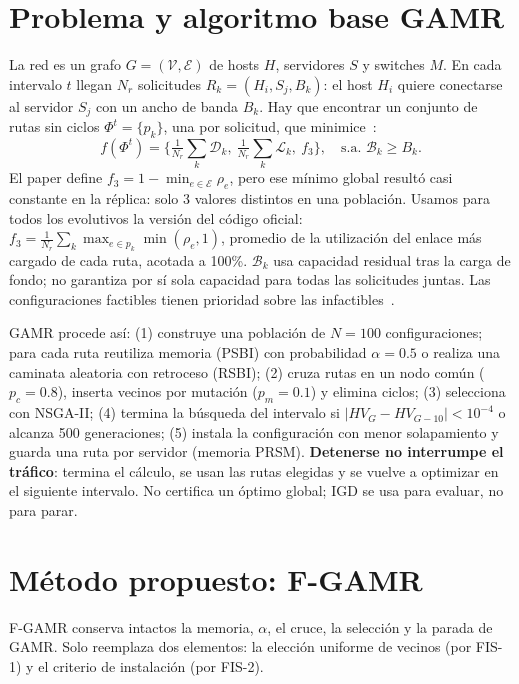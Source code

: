 \documentclass[conference]{IEEEtran}
\newcommand{\Dc}{\mathcal{D}}
\newcommand{\Lc}{\mathcal{L}}
\newcommand{\Bc}{\mathcal{B}}
\begin{document}
\section{Problema y algoritmo base GAMR}
La red es un grafo $G=(\mathcal{V},\mathcal{E})$ de hosts $H$, servidores $S$ y switches $M$. En cada intervalo $t$ llegan $N_r$ solicitudes $R_k=(H_i,S_j,B_k)$: el host $H_i$ quiere conectarse al servidor $S_j$ con un ancho de banda $B_k$. Hay que encontrar un conjunto de rutas sin ciclos $\Phi^t=\{p_k\}$, una por solicitud, que minimice~\cite{tran2025gamr}:
\begin{equation}
f(\Phi^t)=\Big\{\tfrac{1}{N_r}\textstyle\sum_k \Dc_k,\ \tfrac{1}{N_r}\sum_k \Lc_k,\ f_3\Big\},\quad \text{s.a. } \Bc_k\ge B_k .\label{eq:obj}
\end{equation}
El paper define $f_3=1-\min_{e\in\mathcal{E}}\rho_e$, pero ese mínimo global resultó casi constante en la réplica: solo 3 valores distintos en una población. Usamos para todos los evolutivos la versión del código oficial: $f_3=\frac{1}{N_r}\sum_k\max_{e\in p_k}\min(\rho_e,1)$, promedio de la utilización del enlace más cargado de cada ruta, acotada a 100\%. $\Bc_k$ usa capacidad residual tras la carga de fondo; no garantiza por sí sola capacidad para todas las solicitudes juntas. Las configuraciones factibles tienen prioridad sobre las infactibles~\cite{deb2000constraint}.

GAMR procede así: (1) construye una población de $N=100$ configuraciones; para cada ruta reutiliza memoria (PSBI) con probabilidad $\alpha=0.5$ o realiza una caminata aleatoria con retroceso (RSBI); (2) cruza rutas en un nodo común ($p_c=0.8$), inserta vecinos por mutación ($p_m=0.1$) y elimina ciclos; (3) selecciona con NSGA-II; (4) termina la búsqueda del intervalo si $|HV_G-HV_{G-10}|<10^{-4}$ o alcanza 500 generaciones; (5) instala la configuración con menor solapamiento y guarda una ruta por servidor (memoria PRSM). \textbf{Detenerse no interrumpe el tráfico}: termina el cálculo, se usan las rutas elegidas y se vuelve a optimizar en el siguiente intervalo. No certifica un óptimo global; IGD se usa para evaluar, no para parar.

\section{Método propuesto: F-GAMR}
F-GAMR conserva intactos la memoria, $\alpha$, el cruce, la selección y la parada de GAMR. Solo reemplaza dos elementos: la elección uniforme de vecinos (por FIS-1) y el criterio de instalación (por FIS-2).
\end{document}
